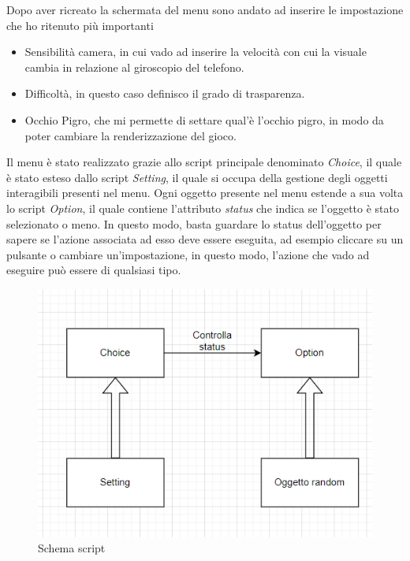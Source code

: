 \documentclass[
a4paper,
cleardoublepage=empty,
headings=twolinechapter,
numbers=autoenddot,
]{scrbook}
\begin{document}
	Dopo aver ricreato la schermata del menu sono andato ad inserire le impostazione che ho ritenuto più importanti
	\begin{itemize}
		\item Sensibilità camera, in cui vado ad inserire la velocità con cui la visuale cambia in relazione al giroscopio del telefono.
		\item Difficoltà, in questo caso definisco il grado di trasparenza. 
		\item Occhio Pigro, che mi permette di settare qual'è l'occhio pigro, in modo da poter cambiare la renderizzazione del gioco.
	\end{itemize}
    Il menu è stato realizzato grazie allo script principale denominato \textit{Choice}, il quale è stato esteso dallo script \textit{Setting}, il quale si occupa della gestione degli oggetti interagibili presenti nel menu. Ogni oggetto presente nel menu estende a sua volta lo script \textit{Option}, il quale contiene l'attributo \textit{status} che indica se l'oggetto è stato selezionato o meno. In questo modo, basta guardare lo status dell'oggetto per sapere se l'azione associata ad esso deve essere eseguita, ad esempio cliccare su un pulsante o cambiare un'impostazione, in questo modo, l'azione che vado ad eseguire può essere di qualsiasi tipo.
	\begin{figure}[h]
		\centering
		\includegraphics[width=0.6\linewidth]{image/funzionamento menu}
		\caption{Schema script}
		\label{fig:menu_funzionamento}
    \end{figure}
\end{document}
